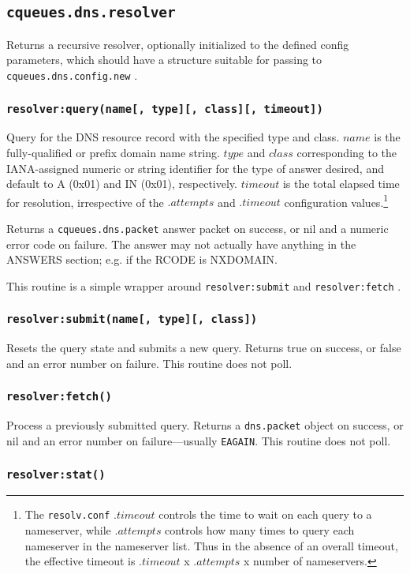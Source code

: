\documentclass[11pt, oneside]{memoir}
\newcommand{\fn}[1]{\texttt{#1} }
\newcommand{\module}[1]{\texttt{#1} }
\newcounter{toccols}
\newenvironment{Module}[1]{
	\subsection{\texttt{#1}}
	\addtocontents{toc}{
		\protect\begin{multicols}{\value{toccols}}
	}
}{
	\addtocontents{toc}{\protect\end{multicols}}
}
\begin{document}
\begin{Module}{cqueues.dns.resolver}
Returns a recursive resolver, optionally initialized to the defined config parameters, which should have a structure suitable for passing to \fn{cqueues.dns.config.new}.

\subsubsection[\fn{resolver:query}]{\fn{resolver:query(name[, type][, class][, timeout])}}

Query for the DNS resource record with the specified type and class. $name$ is the fully-qualified or prefix domain name string. $type$ and $class$ corresponding to the IANA-assigned numeric or string identifier for the type of answer desired, and default to A (0x01) and IN (0x01), respectively. $timeout$ is the total elapsed time for resolution, irrespective of the $.attempts$ and $.timeout$ configuration values.\footnote{The \texttt{resolv.conf} $.timeout$ controls the time to wait on each query to a nameserver, while $.attempts$ controls how many times to query each nameserver in the nameserver list. Thus in the absence of an overall timeout, the effective timeout is $.timeout$ x $.attempts$ x number of nameservers.}

Returns a \module{cqueues.dns.packet} answer packet on success, or nil and a numeric error code on failure. The answer may not actually have anything in the ANSWERS section; e.g. if the RCODE is NXDOMAIN.

This routine is a simple wrapper around \fn{resolver:submit} and \fn{resolver:fetch}.

\subsubsection[\fn{resolver:submit}]{\fn{resolver:submit(name[, type][, class])}}

Resets the query state and submits a new query. Returns true on success, or false and an error number on failure. This routine does not poll.

\subsubsection[\fn{resolver:fetch}]{\fn{resolver:fetch()}}

Process a previously submitted query. Returns a \module{dns.packet} object on success, or nil and an error number on failure---usually \texttt{EAGAIN}. This routine does not poll.

\subsubsection[\fn{resolver:stat}]{\fn{resolver:stat()}}


\end{Module}
\end{document}
